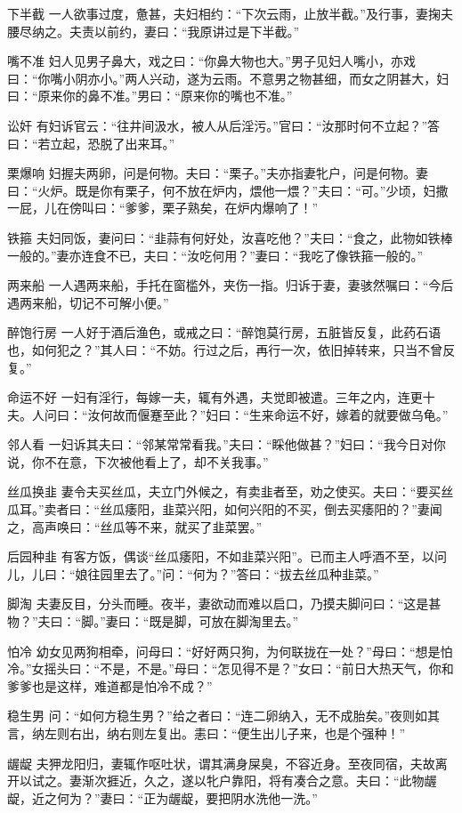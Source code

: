 \documentclass[12pt,UTF8]{ctexbook}
\begin{document}
下半截
一人欲事过度，惫甚，夫妇相约：“下次云雨，止放半截。”及行事，妻掬夫腰尽纳之。夫责以前约，妻曰：“我原讲过是下半截。”

嘴不准
妇人见男子鼻大，戏之曰：“你鼻大物也大。”男子见妇人嘴小，亦戏曰：“你嘴小阴亦小。”两人兴动，遂为云雨。不意男之物甚细，而女之阴甚大，妇曰：“原来你的鼻不准。”男曰：“原来你的嘴也不准。”

讼奸
有妇诉官云：“往井间汲水，被人从后淫污。”官曰：“汝那时何不立起？”答曰：“若立起，恐脱了出来耳。”

栗爆响
妇握夫两卵，问是何物。夫曰：“栗子。”夫亦指妻牝户，问是何物。妻曰：“火炉。既是你有栗子，何不放在炉内，煨他一煨？”夫曰：“可。”少顷，妇撒一屁，儿在傍叫曰：“爹爹，栗子熟矣，在炉内爆响了！”

铁箍
夫妇同饭，妻问曰：“韭蒜有何好处，汝喜吃他？”夫曰：“食之，此物如铁棒一般的。”妻亦连食不已，夫曰：“汝吃何用？”妻曰：“我吃了像铁箍一般的。”

两来船
一人遇两来船，手托在窗槛外，夹伤一指。归诉于妻，妻骇然嘱曰：“今后遇两来船，切记不可解小便。”

醉饱行房
一人好于酒后渔色，或戒之曰：“醉饱莫行房，五脏皆反复，此药石语也，如何犯之？”其人曰：“不妨。行过之后，再行一次，依旧掉转来，只当不曾反复。”

命运不好
一妇有淫行，每嫁一夫，辄有外遇，夫觉即被遣。三年之内，连更十夫。人问曰：“汝何故而偃蹇至此？”妇曰：“生来命运不好，嫁着的就要做乌龟。”

邻人看
一妇诉其夫曰：“邻某常常看我。”夫曰：“睬他做甚？”妇曰：“我今日对你说，你不在意，下次被他看上了，却不关我事。”

丝瓜换韭
妻令夫买丝瓜，夫立门外候之，有卖韭者至，劝之使买。夫曰：“要买丝瓜耳。”卖者曰：“丝瓜痿阳，韭菜兴阳，如何兴阳的不买，倒去买痿阳的？”妻闻之，高声唤曰：“丝瓜等不来，就买了韭菜罢。”

后园种韭
有客方饭，偶谈“丝瓜痿阳，不如韭菜兴阳”。已而主人呼酒不至，以问儿，儿曰：“娘往园里去了。”问：“何为？”答曰：“拔去丝瓜种韭菜。”

脚淘
夫妻反目，分头而睡。夜半，妻欲动而难以启口，乃摸夫脚问曰：“这是甚物？”夫曰：“脚。”妻曰：“既是脚，可放在脚淘里去。”

怕冷
幼女见两狗相牵，问母曰：“好好两只狗，为何联拢在一处？”母曰：“想是怕冷。”女摇头曰：“不是，不是。”母曰：“怎见得不是？”女曰：“前日大热天气，你和爹爹也是这样，难道都是怕冷不成？”

稳生男
问：“如何方稳生男？”给之者曰：“连二卵纳入，无不成胎矣。”夜则如其言，纳左则右出，纳右则左复出。恚曰：“便生出儿子来，也是个强种！”

龌龊
夫狎龙阳归，妻辄作呕吐状，谓其满身屎臭，不容近身。至夜同宿，夫故离开以试之。妻渐次捱近，久之，遂以牝户靠阳，将有凑合之意。夫曰：“此物龌龊，近之何为？”妻曰：“正为龌龊，要把阴水洗他一洗。”
\end{document}

